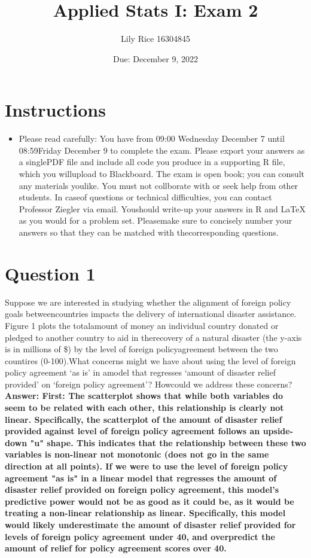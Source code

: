 \documentclass[12pt,letterpaper]{article}
\title{Applied Stats I: Exam 2}
\date{Due: December 9, 2022}
\author{Lily Rice 16304845}
\begin{document}
	\maketitle
	\section*{Instructions}
	\begin{itemize}
		\item Please read carefully: You have from 09:00 Wednesday December 7 until 08:59Friday December 9 to complete the exam. Please export your answers as a singlePDF file and include all code you produce in a supporting R file, which you willupload to Blackboard. The exam is open book; you can consult any materials youlike. You must not collborate with or seek help from other students. In caseof questions or technical difficulties, you can contact Professor Ziegler via email. Youshould write-up your answers in R and LaTeX as you would for a problem set. Pleasemake sure to concisely number your answers so that they can be matched with thecorresponding questions.
	\end{itemize}

\newpage
	
	\vspace{.5cm}
	\section*{Question 1}
	\vspace{.25cm}
	\noindent 	
	Suppose we are interested in studying whether the alignment of foreign policy goals betweencountries impacts the delivery of international disaster assistance. Figure 1 plots the totalamount of money an individual country donated or pledged to another country to aid in therecovery of a natural disaster (the y-axis is in millions of \$) by the level of foreign policyagreement between the two countires (0-100).What concerns might we have about using the level of foreign policy agreement ‘as is’ in amodel that regresses ‘amount of disaster relief provided’ on ‘foreign policy agreement’? Howcould we address these concerns?
	\\
	
	\textbf{Answer: First: The scatterplot shows that while both variables do seem to be related with each other, this relationship is clearly not linear. Specifically, the scatterplot of the amount of disaster relief provided against level of foreign policy agreement follows an upside-down "u" shape. This indicates that the relationship between these two variables is non-linear not monotonic (does not go in the same direction at all points). If we were to use the level of foreign policy agreement "as is" in a linear model that regresses the amount of disaster relief provided on foreign policy agreement, this model's predictive power would not be as good as it could be, as it would be treating a non-linear relationship as linear. Specifically, this model would likely underestimate the amount of disaster relief provided for levels of foreign policy agreement under 40, and overpredict the amount of relief for policy agreement scores over 40.}
	\\
	
\end{document}
